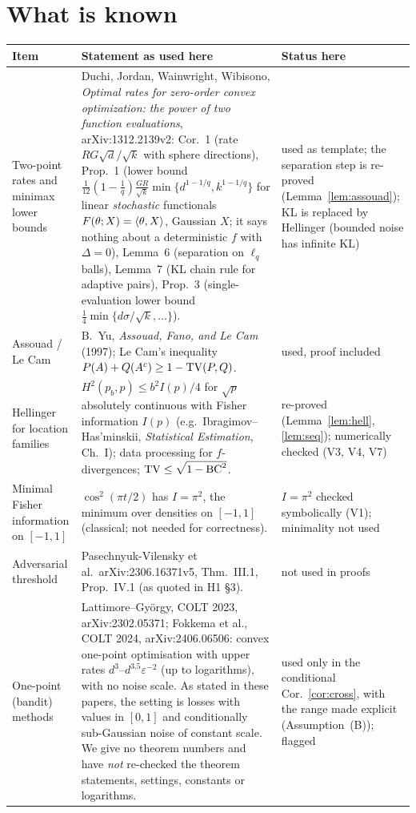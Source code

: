 \documentclass[11pt,a4paper]{article}
\numberwithin{equation}{section}
\theoremstyle{definition}
\theoremstyle{remark}
\begin{document}
\section{What is known}\label{sec:known}
\begin{center}\small
\begin{tabularx}{\textwidth}{@{}p{2.6cm}Xp{2.5cm}@{}}
\toprule
Item & Statement as used here & Status here\\
\midrule
Two-point rates and minimax lower bounds & Duchi, Jordan, Wainwright, Wibisono, \emph{Optimal rates for zero-order convex optimization: the power of two function evaluations}, arXiv:1312.2139v2: Cor.~1 (rate $RG\sqrt d/\sqrt k$ with sphere directions), Prop.~1 (lower bound $\frac1{12}(1-\frac1q)\frac{GR}{\sqrt k}\min\{d^{1-1/q},k^{1-1/q}\}$ for linear \emph{stochastic} functionals $F(\theta;X)=\langle \theta,X\rangle$, Gaussian $X$; it says nothing about a deterministic $f$ with $\Delta=0$), Lemma~6 (separation on $\ell_q$ balls), Lemma~7 (KL chain rule for adaptive pairs), Prop.~3 (single-evaluation lower bound $\frac14\min\{d\sigma/\sqrt k,\dots\}$). & used as template; the separation step is re-proved (Lemma~\ref{lem:assouad}); KL is replaced by Hellinger (bounded noise has infinite KL) \\
Assouad / Le Cam & B.~Yu, \emph{Assouad, Fano, and Le Cam} (1997); Le Cam's inequality $P(A)+Q(A^c)\ge1-\mathrm{TV}(P,Q)$. & used, proof included \\
Hellinger for location families & $H^2(p_b,p)\le b^2I(p)/4$ for $\sqrt p$ absolutely continuous with Fisher information $I(p)$ (e.g.\ Ibragimov--Has'minskii, \emph{Statistical Estimation}, Ch.~I); data processing for $f$-divergences; $\mathrm{TV}\le\sqrt{1-\mathrm{BC}^2}$. & re-proved (Lemma~\ref{lem:hell}, \ref{lem:seq}); numerically checked (V3, V4, V7) \\
Minimal Fisher information on $[-1,1]$ & $\cos^2(\pi t/2)$ has $I=\pi^2$, the minimum over densities on $[-1,1]$ (classical; not needed for correctness). & $I=\pi^2$ checked symbolically (V1); minimality not used \\
Adversarial threshold & Pasechnyuk-Vilensky et al.\ arXiv:2306.16371v5, Thm.~III.1, Prop.~IV.1 (as quoted in H1 \S3). & not used in proofs \\
One-point (bandit) methods & Lattimore--Gy\"orgy, COLT 2023, arXiv:2302.05371; Fokkema et al., COLT 2024, arXiv:2406.06506: convex one-point optimisation with upper rates $d^3$--$d^{3.5}\varepsilon^{-2}$ (up to logarithms), with no noise scale. As stated in these papers, the setting is losses with values in $[0,1]$ and conditionally sub-Gaussian noise of constant scale. We give no theorem numbers and have \emph{not} re-checked the theorem statements, settings, constants or logarithms. & used only in the conditional Cor.~\ref{cor:cross}, with the range made explicit (Assumption~(B)); flagged \\

\end{tabularx}
\end{center}
\end{document}
